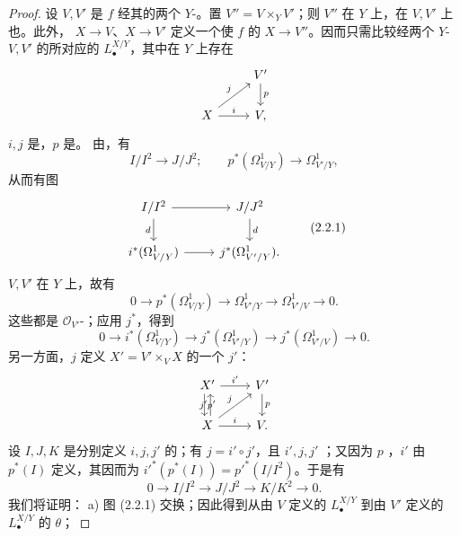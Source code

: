 \begin{proof}
设 $V,V'$ 是 $f$ 经其的两个 $Y$-。置 $V''=V\times_YV'$；则 $V''$ 在 $Y$ 上，在 $V,V'$ 上也。此外， $X\to V$、$X\to V'$ 定义一个使 $f$ 的 $X\to V''$。因而只需比较经两个 $Y$- $V,V'$ 的所对应的 $L^{X/Y}_\bullet$，其中在 $Y$ 上存在
\[
\begin{tikzcd}&V'\arrow[d,"p"]\\X\arrow[ur,"j"]\arrow[r,"i"]&V,\end{tikzcd}
\]
$i,j$ 是，$p$ 是。
由，有
\[I/I^2\longrightarrow J/J^2;\qquad p^*(\Omega^1_{V/Y})\longrightarrow\Omega^1_{V'/Y},\]
从而有图
\[
\begin{tikzcd}I/I^2\arrow[r]\arrow[d,"d"']&J/J^2\arrow[d,"d"]\\i^*(\Omega^1_{V/Y})\arrow[r]&j^*(\Omega^1_{V'/Y}).\end{tikzcd}\tag{2.2.1}
\]
$V,V'$ 在 $Y$ 上，故有
\[0\longrightarrow p^*(\Omega^1_{V/Y})\longrightarrow\Omega^1_{V'/Y}\longrightarrow\Omega^1_{V'/V}\longrightarrow0.\]
这些都是 $\mathscr O_{V'}$-；应用 $j^*$，得到
\[0\longrightarrow i^*(\Omega^1_{V/Y})\longrightarrow j^*(\Omega^1_{V'/Y})\longrightarrow j^*(\Omega^1_{V'/V})\longrightarrow0.\tag{2.2.2}\]
另一方面，$j$ 定义 $X'=V'\times_VX$ 的一个 $j'$：
\[
\begin{tikzcd}X'\arrow[r,"i'"]\arrow[d,"p'",shift right]&V'\arrow[d,"p"]\\X\arrow[u,"j'",shift right]\arrow[r,"i"]\arrow[ur,"j"]&V.\end{tikzcd}
\]
设 $I,J,K$ 是分别定义 $i,j,j'$ 的；有 $j=i'\circ j'$，且 $i',j,j'$ ；又因为 $p$ ，$i'$ 由 $p^*(I)$ 定义，其因而为 $i'^*(p^*(I))=p'^*(I/I^2)$。于是有
\[0\longrightarrow I/I^2\longrightarrow J/J^2\longrightarrow K/K^2\longrightarrow0.\tag{2.2.3}\]
我们将证明：
a) 图 (2.2.1) 交换；因此得到从由 $V$ 定义的 $L^{X/Y}_\bullet$ 到由 $V'$ 定义的 $L^{X/Y}_\bullet$ 的 $\theta$；

\end{proof}
